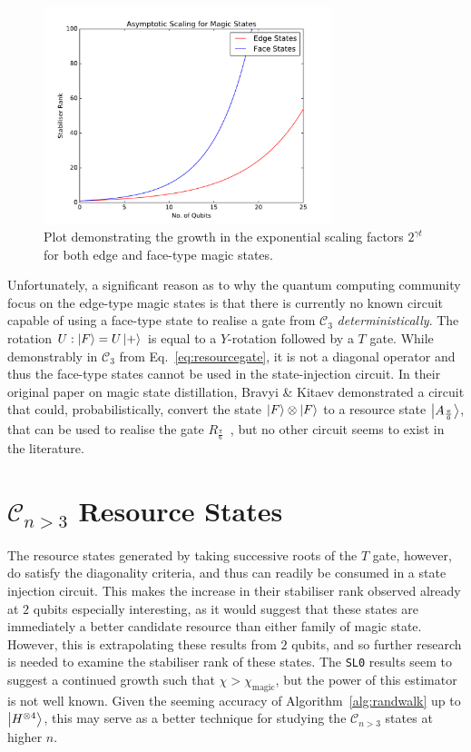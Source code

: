 \documentclass{standalone}
\begin{document}
\begin{figure}[t]
\centering
\includegraphics[width=0.75\textwidth]{Figures/magicrank.pdf}
\caption{Plot demonstrating the growth in the exponential scaling factors $2^{\gamma t}$ for both edge and face-type magic states.}
\label{fig:magicscale}
\end{figure}
\par
Unfortunately, a significant reason as to why the quantum computing community focus on the edge-type magic states is that there is currently no known circuit capable of using a face-type state to realise a gate from $\mathcal{C}_{3}$ \emph{deterministically}. The rotation $U:\ket{F}=U\ket{+}$ is equal to a $Y$-rotation followed by a $T$ gate. While demonstrably in $\mathcal{C}_{3}$ from Eq.~\ref{eq:resourcegate}, it is not a diagonal operator and thus the face-type states cannot be used in the state-injection circuit. In their original paper on magic state distillation, Bravyi \& Kitaev demonstrated a circuit that could, probabilistically, convert the state $\ket{F}\otimes\ket{F}$ to a resource state $\ket{A_{\frac{\pi}{6}}}$, that can be used to realise the gate $R_{\frac{\pi}{6}}$~\cite{Bravyi2005}, but no other circuit seems to exist in the literature. 

\section{$\mathcal{C}_{n>3}$ Resource States}
The resource states generated by taking successive roots of the $T$ gate, however, do satisfy the diagonality criteria, and thus can readily be consumed in a state injection circuit. This makes the increase in their stabiliser rank observed already at $2$ qubits especially interesting, as it would suggest that these states are immediately a better candidate resource than either family of magic state. \\
However, this is extrapolating these results from $2$ qubits, and so further research is needed to examine the stabiliser rank of these states. The \texttt{SL0} results seem to suggest a continued growth such that $\chi>\chi_{\text{magic}}$, but the power of this estimator is not well known. Given the seeming accuracy of Algorithm~\ref{alg:randwalk} up to $\ket{H^{\otimes 4}}$, this may serve as a better technique for studying the $\mathcal{C}_{n>3}$ states at higher $n$.
\end{document}
